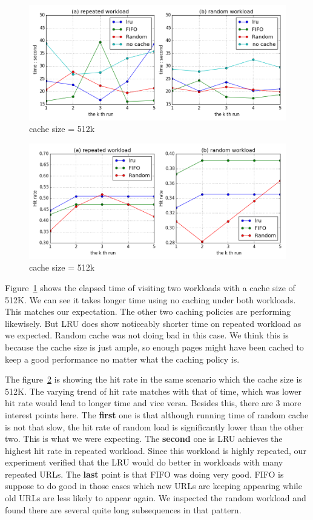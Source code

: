 \documentclass[paper=a4, fontsize=11pt]{scrartcl} %
\numberwithin{equation}{section} %
\numberwithin{figure}{section} %
\numberwithin{table}{section} %
\begin{document}
\begin{figure}[h]
  \centering
  \includegraphics[width=\textwidth]{../data/time512k}
  \caption{cache size = 512k}
  \label{fig:time512k}
\end{figure}
\begin{figure}[h]
  \centering
  \includegraphics[width=\textwidth]{../data/hit512k}
  \caption{cache size = 512k}
  \label{fig:hit512k}
\end{figure}
Figure~\ref{fig:time512k} shows the elapsed time of visiting two workloads with a cache size of 512K. We can see it takes longer time using no caching under both workloads. This matches our expectation. The other two caching policies are performing likewisely. But LRU does show noticeably shorter time on repeated workload as we expected. Random cache was not doing bad in this case. We think this is because the cache size is just ample, so enough pages might have been cached to keep a good performance no matter what the caching policy is. 

\vspace{0.5em}

The figure~\ref{fig:hit512k} is showing the hit rate in the same scenario which the cache size is 512K. The varying trend of hit rate matches with that of time, which was lower hit rate would lead to longer time and vice versa. Besides this, there are 3 more interest points here. The 
\textbf{first} one is that although running time of random cache is not that slow, the hit rate of random load is significantly lower than the other two. This is what we were expecting. 
The \textbf{second} one is LRU achieves the highest hit rate in repeated workload. Since this workload is highly repeated, our experiment verified that the LRU would do better in workloads with many repeated URLs. 
The \textbf{last} point is that FIFO was doing very good. FIFO is suppose to do good in those cases which new URLs are keeping appearing while old URLs are less likely to appear again. We inspected the random workload and found there are several quite long subsequences in that pattern.
\end{document}
